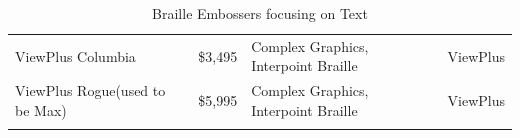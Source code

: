 \documentclass[12pt,letterpaper,twoside]{extreport}
\begin{document}
\begin{longtable}[]{@{}
	>{\raggedright\arraybackslash}m{}
	>{\raggedright\arraybackslash}m{}
	>{\raggedright\arraybackslash}m{}
	>{\raggedright\arraybackslash}b{}@{}
	}
ViewPlus Columbia                                                                                                                               & \$3,495                                                                                                                                                          & Complex Graphics, Interpoint Braille & ViewPlus                \\[1.0em]
ViewPlus Rogue\break (used to be Max)& \$5,995                                                                                                                                                          & Complex Graphics, Interpoint Braille & ViewPlus                \\[1.0em]\hline
	\caption[ Braille Embossers focusing on Text]{ Braille Embossers focusing on Text}\label{tab:table16}
\end{longtable}
\end{document}
